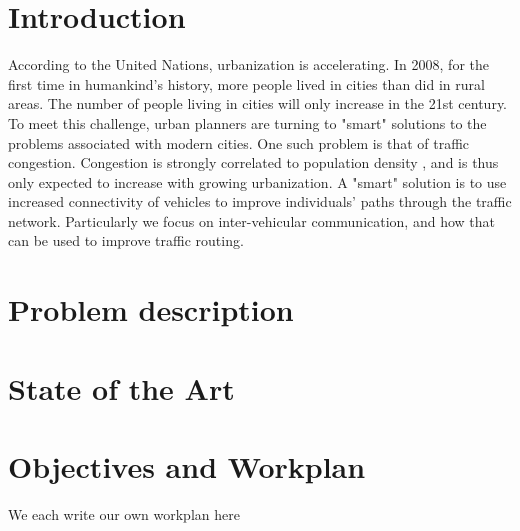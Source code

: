 \documentclass{article}
\begin{document}
\section{Introduction}
According to the United Nations, urbanization is accelerating. In 2008, for the first time in humankind's history, more people lived in cities than did in rural areas. The number of people living in cities will only increase in the 21st century. To meet this challenge, urban planners are turning to "smart" solutions to the problems associated with modern cities. One such problem is that of traffic congestion. Congestion is strongly correlated to population density \cite{Manville2005}, and is thus only expected to increase with growing urbanization. A "smart" solution is to use increased connectivity of vehicles to improve individuals' paths through the traffic network. Particularly we focus on inter-vehicular communication, and how that can be used to improve traffic routing.

\section{Problem description}


\section{State of the Art}
\section{Objectives and Workplan}
We each write our own workplan here



\end{document}
